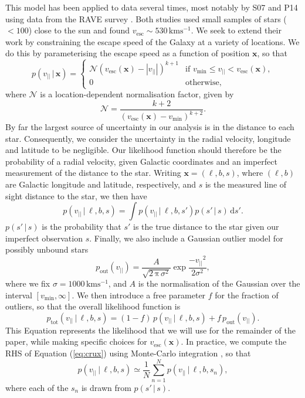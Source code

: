 \documentclass[useAMS,twocolumn,usenatbib]{mn2e}
\def\kms{{\,\mathrm{kms^{-1}}}}
\def\vlos{{v_{||}}}
\def\vesc{{v_\mathrm{esc}}}
\def\vmin{{v_\mathrm{min}}}
\def\pos{{\boldsymbol{x}}}
\def\intd{{\mathrm{d}}}
\begin{document}
This model has been applied to data several times, most notably by S07 and P14 using data from the {\sc RAVE} survey \citep{Ko13}. 
Both studies used small samples of stars ($<100$) close to the sun and found $\vesc \sim 530\kms$. 
We seek to extend their work by constraining the escape speed of the Galaxy at a variety of locations. 
We do this by parameterising the escape speed as a function of position $\pos$, so that
%
\begin{equation}
  p(\vlos \,|\, \pos) = \begin{cases}
    \mathcal{N}(\vesc(\pos) - |\vlos|)^{k+1} & \text{if $\vmin \leq \vlos <\vesc(\pos)$},\\
    0 & \text{otherwise},
  \end{cases}
  \label{eq:model}
\end{equation}
%
where $\mathcal{N}$ is a location-dependent normalisation factor, given by
%
\begin{equation}
\mathcal{N} = \dfrac{k+2}{(\vesc(\pos) - \vmin)^{k+2}}.
\label{eq:norm}
\end{equation}
%
By far the largest source of uncertainty in our analysis is in the distance to each star. 
Consequently, we consider the uncertainty in the radial velocity, longitude and latitude to be negligible. 
Our likelihood function should therefore be the probability of a radial velocity, given Galactic coordinates and an imperfect measurement of the distance to the star. 
Writing $\pos = (\ell, b, s)$, where $(\ell,b)$ are Galactic longitude and latitude, respectively, and $s$ is the measured line of sight distance to the star, we then have
%
\begin{equation}
p(\vlos \,|\, \ell, b, s) = \int p(\vlos \,| \,\ell, b, s' )p(s'\,|\,s)\, \intd s'.
\label{eq:crux}
\end{equation}
%
$p(s'\,|\,s)$ is the probability that $s'$ is the true distance to the star given our imperfect observation $s$. 
Finally, we also include a Gaussian outlier model for possibly unbound stars
%
\begin{equation}
p_\mathrm{out}(\vlos) = \dfrac{A}{\sqrt{2\,\mathrm{\pi}\,\sigma^2}}\exp \dfrac{-\vlos^2}{2\sigma^2},
\end{equation}
%
where we fix $\sigma = 1000\kms$, and $A$ is the normalisation of the Gaussian over the interval $\left[v_\mathrm{min},\infty\right]$. 
We then introduce a free parameter $f$ for the fraction of outliers, so that the overall likelihood function is
%
\begin{equation}
p_\mathrm{tot}(\vlos \,|\, \ell, b, s) = (1-f)\,p(\vlos \,|\, \ell, b, s) + f\,p_\mathrm{out}(\vlos).
\end{equation}
%
This Equation represents the likelihood that we will use for the remainder of the paper, while making specific choices for $\vesc(\pos)$. 
In practice, we compute the RHS of Equation (\ref{eq:crux}) using Monte-Carlo integration \citep[e.g.][]{Ev16,Bo16}, so that
%
\begin{equation}
p(\vlos \,|\, \ell, b, s) \simeq \dfrac{1}{N}\sum\limits_{n=1}^{N} p(\vlos \,| \,\ell, b, s_n ),
\end{equation}
%
where each of the $s_n$ is drawn from $p(s'\,|\,s)$.
\end{document}
